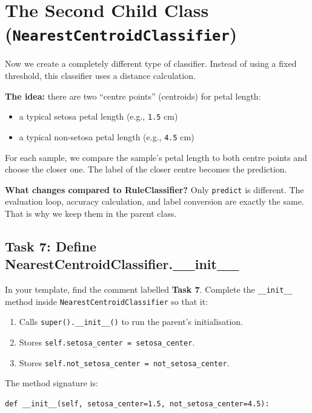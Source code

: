 \section{The Second Child Class (\texttt{NearestCentroidClassifier})}

Now we create a completely different type of classifier.
Instead of using a fixed threshold, this classifier uses a distance calculation.

\medskip
\noindent
\textbf{The idea:} there are two ``centre points'' (centroids) for petal length:
\begin{itemize}
    \item a typical setosa petal length (e.g., \texttt{1.5} cm)
    \item a typical non-setosa petal length (e.g., \texttt{4.5} cm)
\end{itemize}

\noindent
For each sample, we compare the sample's petal length to both centre points and choose the closer one.
The label of the closer centre becomes the prediction.

\medskip
\noindent
\textbf{What changes compared to RuleClassifier?}
Only \texttt{predict} is different.
The evaluation loop, accuracy calculation, and label conversion are exactly the same.
That is why we keep them in the parent class.

\subsection{Task 7: Define NearestCentroidClassifier.\_\_init\_\_}

\begin{tcolorbox}[title=Task 7: Define NearestCentroidClassifier.\_\_init\_\_]
In your template, find the comment labelled \textbf{Task 7}.
Complete the \texttt{\_\_init\_\_} method inside \texttt{NearestCentroidClassifier} so that it:
\begin{enumerate}
    \item Calls \texttt{super().\_\_init\_\_()} to run the parent's initialisation.
    \item Stores \texttt{self.setosa\_center = setosa\_center}.
    \item Stores \texttt{self.not\_setosa\_center = not\_setosa\_center}.
\end{enumerate}

\medskip
The method signature is:
\begin{verbatim}
def __init__(self, setosa_center=1.5, not_setosa_center=4.5):
\end{verbatim}
\end{tcolorbox}

